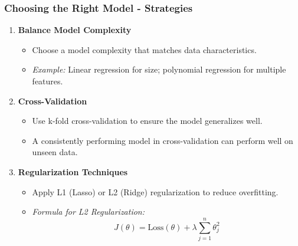 \documentclass[aspectratio=169]{beamer}
\begin{document}
\begin{frame}[fragile]
    \frametitle{Choosing the Right Model - Strategies}
    \begin{enumerate}
        \item \textbf{Balance Model Complexity}
        \begin{itemize}
            \item Choose a model complexity that matches data characteristics.
            \item \textit{Example:} Linear regression for size; polynomial regression for multiple features.
        \end{itemize}
        
        \item \textbf{Cross-Validation}
        \begin{itemize}
            \item Use k-fold cross-validation to ensure the model generalizes well. 
            \item A consistently performing model in cross-validation can perform well on unseen data.
        \end{itemize}
        
        \item \textbf{Regularization Techniques}
        \begin{itemize}
            \item Apply L1 (Lasso) or L2 (Ridge) regularization to reduce overfitting.
            \item \textit{Formula for L2 Regularization:}
            \begin{equation}
                J(\theta) = \text{Loss}(\theta) + \lambda \sum_{j=1}^{n} \theta_j^2
            \end{equation}
        \end{itemize}
    \end{enumerate}
\end{frame}
\end{document}
